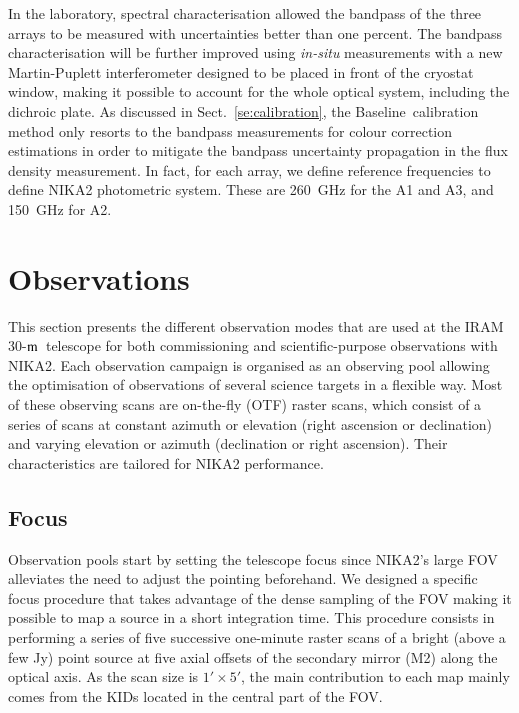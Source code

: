 \documentclass[traditionalabstract]{aa}
\newcommand{\trentemetre}{30-$\rm{m}$}
\newcommand{\baseline}{Baseline}%
\newcommand{\lp}[1]{#1}
\begin{document}
{\lp In the laboratory, spectral characterisation allowed the bandpass of the
three arrays to be measured with uncertainties better than one
percent. The bandpass characterisation will be further improved using
\emph{in-situ} measurements with a new Martin-Puplett interferometer designed
to be placed in front of the cryostat window, making it possible to
account for the whole optical system, including the dichroic plate. As discussed in Sect.~\ref{se:calibration}, the \baseline\ calibration method
only resorts to the bandpass measurements for colour correction
estimations in order to mitigate the bandpass uncertainty propagation
in the flux density measurement.}
In fact, for each array, we define reference frequencies 
to define NIKA2 photometric system. These are 260~GHz for the A1 and A3, and
150~GHz for A2.




\section{Observations}
\label{se:observations}
%

This section presents the different observation modes that are used at
the IRAM \trentemetre\ telescope for both commissioning and
scientific-purpose observations with NIKA2. {\lp Each observation
campaign is organised as an observing pool allowing the optimisation of
observations of several science targets in a flexible way.}
Most of these observing scans are on-the-fly (OTF) raster scans,
which consist of a series of scans at constant azimuth or elevation
(right ascension or declination) and varying elevation or azimuth
(declination or right ascension).
Their characteristics are tailored for NIKA2 performance.


\subsection{Focus}
\label{se:axial_focus}

Observation pools start by setting the telescope focus since NIKA2's large
FOV alleviates the need to adjust the pointing beforehand.  
We designed a specific focus procedure that takes
advantage of the dense sampling of the FOV making it possible to map a source
in a short integration time. This procedure consists in performing a series of five successive one-minute raster scans of a bright (above a few Jy) point source at five
axial offsets of the secondary mirror (M2) along the optical
axis. As the scan size is $1'\times 5'$, the main contribution to each
map mainly comes from the KIDs located in the central part of the FOV.
\end{document}
